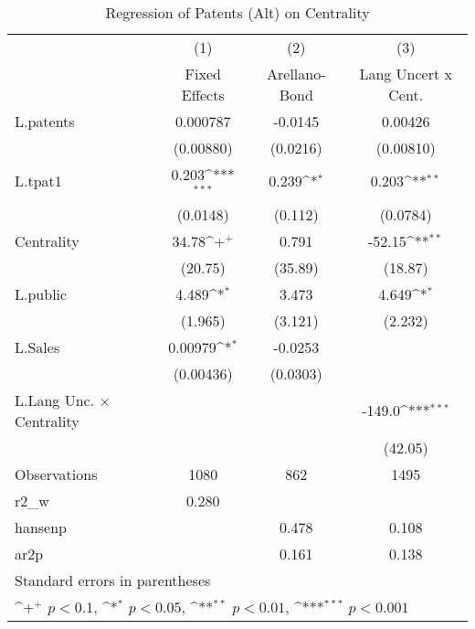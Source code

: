 \begin{table}[htbp]\centering \caption{Regression of Patents (Alt) on Centrality\label{r9}}
{
\def\sym#1{\ifmmode^{#1}\else\(^{#1}\)\fi}
\begin{tabular}{l*{3}{c}}
\hline\hline
                    &\multicolumn{1}{c}{(1)}&\multicolumn{1}{c}{(2)}&\multicolumn{1}{c}{(3)}\\
                    &\multicolumn{1}{c}{Fixed Effects}&\multicolumn{1}{c}{Arellano-Bond}&\multicolumn{1}{c}{Lang Uncert x Cent.}\\
\hline
L.patents           &    0.000787         &     -0.0145         &     0.00426         \\
                    &   (0.00880)         &    (0.0216)         &   (0.00810)         \\
L.tpat1             &       0.203\sym{***}&       0.239\sym{*}  &       0.203\sym{**} \\
                    &    (0.0148)         &     (0.112)         &    (0.0784)         \\
Centrality          &       34.78\sym{+}  &       0.791         &      -52.15\sym{**} \\
                    &     (20.75)         &     (35.89)         &     (18.87)         \\
L.public            &       4.489\sym{*}  &       3.473         &       4.649\sym{*}  \\
                    &     (1.965)         &     (3.121)         &     (2.232)         \\
L.Sales             &     0.00979\sym{*}  &     -0.0253         &                     \\
                    &   (0.00436)         &    (0.0303)         &                     \\
L.Lang Unc. $\times$ Centrality&                     &                     &      -149.0\sym{***}\\
                    &                     &                     &     (42.05)         \\
\hline
Observations        &        1080         &         862         &        1495         \\
r2\_w                &       0.280         &                     &                     \\
hansenp             &                     &       0.478         &       0.108         \\
ar2p                &                     &       0.161         &       0.138         \\
\hline\hline
\multicolumn{4}{l}{\footnotesize Standard errors in parentheses}\\
\multicolumn{4}{l}{\footnotesize \sym{+} \(p<0.1\), \sym{*} \(p<0.05\), \sym{**} \(p<0.01\), \sym{***} \(p<0.001\)}\\
\end{tabular}
}
\end{table}
